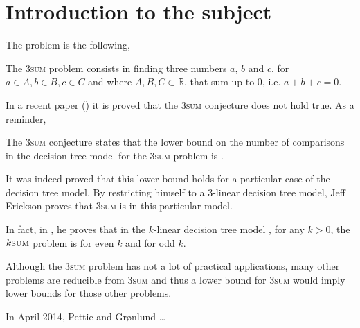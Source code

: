 \section{Introduction to the subject}

The problem is the following,

\begin{problem}
The 3\textsc{sum} problem consists in finding three numbers $a$, $b$ and $c$, for
$a \in A, b \in B, c \in C$ and where $A, B, C \subset \mathbb{R}$, that sum
up to $0$, i.e. $a + b + c = 0$.
\end{problem}

In a recent paper (\cite{DBLP:journals/corr/JorgensenP14}) it is proved that
the 3\textsc{sum} conjecture does not hold true. As a reminder,

\begin{conjecture}
The 3\textsc{sum} conjecture states that the lower bound on the number of
comparisons in the decision tree model for the 3\textsc{sum} problem
is .
\end{conjecture}

It was indeed proved that this lower bound holds for a particular case of the
decision tree model. By restricting himself to a $3$-linear decision tree model,
Jeff Erickson proves that 3\textsc{sum} is  in this particular
model.

In fact, in \cite{cj99-08}, he proves that in the $k$-linear decision tree model
, for any $k > 0$, the $k\textsc{sum}$ problem is 
for even $k$ and  for odd $k$.

Although the 3\textsc{sum} problem has not a lot of practical applications, many
other problems are reducible from 3\textsc{sum} and thus a lower bound for
3\textsc{sum} would imply lower bounds for those other problems.

In April 2014, Pettie and Grønlund \dots
